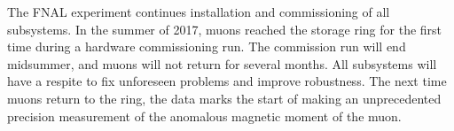 The FNAL \mugmtwo experiment continues installation and commissioning of all subsystems.  In the summer of 2017, muons reached the storage ring for the first time during a hardware commissioning run.  The commission run will end midsummer, and muons will not return for several months.  All subsystems will have a respite to fix unforeseen problems and improve robustness.  The next time muons return to the \mugmtwo ring, the data marks the start of making an unprecedented precision measurement of the anomalous magnetic moment of the muon.







